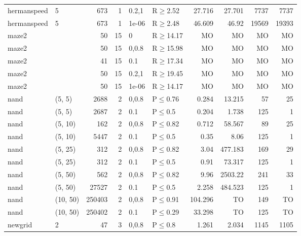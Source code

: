 \begin{longtable}{llrrllrrrr}
 hermanspeed   & 5        &    	673 &   1 & 0.2,1 & R$\geq$2.52  & 27.716  & 27.701  & 7737    & 7737   \\
 hermanspeed   & 5        &    	673 &   1 & 1e-06 & R$\geq$2.48  & 46.609  & 46.92   & 19569   & 19393  \\
 maze2         &          &     	50 &  15 & 0     & R$\geq$14.17 & MO      & MO      & MO      & MO     \\
 maze2         &          &     	50 &  15 & 0,0.8 & R$\geq$15.98 & MO      & MO      & MO      & MO     \\
 maze2         &          &     	41 &  15 & 0.1   & R$\geq$17.34 & MO      & MO      & MO      & MO     \\
 maze2         &          &     	50 &  15 & 0.2,1 & R$\geq$19.45 & MO      & MO      & MO      & MO     \\
 maze2         &          &     	50 &  15 & 1e-06 & R$\geq$14.17 & MO      & MO      & MO      & MO     \\
 nand          & (5, 5)   &   	2688 &   2 & 0,0.8 & P$\leq$0.76  & 0.284   & 13.215  & 57      & 25     \\
 nand          & (5, 5)   &   	2687 &   2 & 0.1   & P$\leq$0.5   & 0.204   & 1.738   & 125     & 1      \\
 nand          & (5, 10)  &    	162 &   2 & 0,0.8 & P$\leq$0.82  & 0.712   & 58.567  & 89      & 25     \\
 nand          & (5, 10)  &   	5447 &   2 & 0.1   & P$\leq$0.5   & 0.35    & 8.06    & 125     & 1      \\
 nand          & (5, 25)  &    	312 &   2 & 0,0.8 & P$\leq$0.82  & 3.04    & 477.183 & 169     & 29     \\
 nand          & (5, 25)  &    	312 &   2 & 0.1   & P$\leq$0.5   & 0.91    & 73.317  & 125     & 1      \\
 nand          & (5, 50)  &    	562 &   2 & 0,0.8 & P$\leq$0.82  & 9.96    & 2503.22 & 241     & 33     \\
 nand          & (5, 50)  &  	27527 &   2 & 0.1   & P$\leq$0.5   & 2.258   & 484.523 & 125     & 1      \\
 nand          & (10, 50) & 	250403 &   2 & 0,0.8 & P$\leq$0.91  & 104.296 & TO      & 149     & TO     \\
 nand          & (10, 50) & 	250402 &   2 & 0.1   & P$\leq$0.29  & 33.298  & TO      & 125     & TO     \\
 newgrid       & 2        &     	47 &   3 & 0,0.8 & P$\leq$0.8   & 1.261   & 2.034   & 1145    & 1105   \\

\end{longtable}

